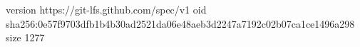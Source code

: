 version https://git-lfs.github.com/spec/v1
oid sha256:0e57f9703dfb1b4b30ad2521da06e48aeb3d2247a7192c02b07ca1ce1496a298
size 1277
